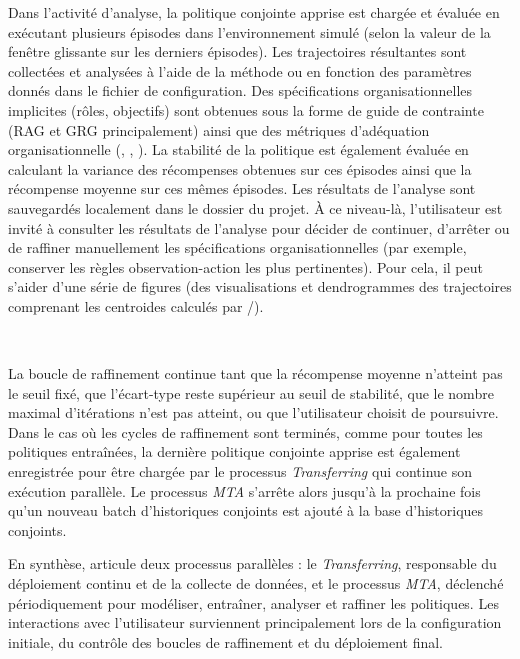 Dans l'activité d'analyse, la politique conjointe apprise est chargée et évaluée en exécutant plusieurs épisodes dans l'environnement simulé (selon la valeur de la fenêtre glissante sur les derniers épisodes). Les trajectoires résultantes sont collectées et analysées à l'aide de la méthode  ou  en fonction des paramètres donnés dans le fichier de configuration. Des spécifications organisationnelles implicites (rôles, objectifs) sont obtenues sous la forme de guide de contrainte (RAG et GRG principalement) ainsi que des métriques d'adéquation organisationnelle (, , ). La stabilité de la politique est également évaluée en calculant la variance des récompenses obtenues sur ces épisodes ainsi que la récompense moyenne sur ces mêmes épisodes. Les résultats de l'analyse sont sauvegardés localement dans le dossier du projet. À ce niveau-là, l'utilisateur est invité à consulter les résultats de l'analyse pour décider de continuer, d'arrêter ou de raffiner manuellement les spécifications organisationnelles (par exemple, conserver les règles observation-action les plus pertinentes). Pour cela, il peut s'aider d'une série de figures (des visualisations  et dendrogrammes des trajectoires comprenant les centroides calculés par /).

\

La boucle de raffinement continue tant que la récompense moyenne n'atteint pas le seuil fixé, que l'écart-type reste supérieur au seuil de stabilité, que le nombre maximal d'itérations n'est pas atteint, ou que l'utilisateur choisit de poursuivre. Dans le cas où les cycles de raffinement sont terminés, comme pour toutes les politiques entraînées, la dernière politique conjointe apprise est également enregistrée pour être chargée par le processus \textit{Transferring} qui continue son exécution parallèle. Le processus \textit{MTA} s'arrête alors jusqu'à la prochaine fois qu'un nouveau batch d'historiques conjoints est ajouté à la base d'historiques conjoints.


\medskip
En synthèse,  articule deux processus parallèles : le \textit{Transferring}, responsable du déploiement continu et de la collecte de données, et le processus \textit{MTA}, déclenché périodiquement pour modéliser, entraîner, analyser et raffiner les politiques.
Les interactions avec l'utilisateur surviennent principalement lors de la configuration initiale, du contrôle des boucles de raffinement et du déploiement final.

